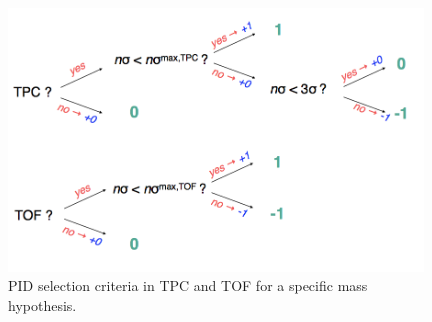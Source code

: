  
\begin{figure}[!h]
\centering
\includegraphics[width=11cm]{FigCap4/strongPID.png}
\caption{PID selection criteria in TPC and TOF for a specific mass hypothesis.}
\label{fig:strongPID}
\end{figure}


